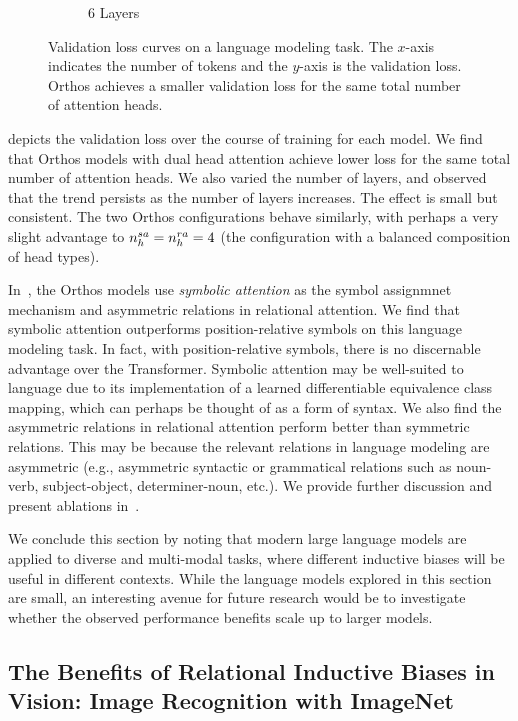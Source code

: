 \begin{figure}[ht]
\begin{subfigure}{0.33\textwidth}
        \caption{6 Layers}
    \end{subfigure}
    \caption{Validation loss curves on a language modeling task. The $x$-axis indicates the number of tokens and the $y$-axis is the validation loss. Orthos achieves a smaller validation loss for the same total number of attention heads.}\label{fig:tiny_stories_val_loss_curves}
\end{figure}

 depicts the validation loss over the course of training for each model. We find that Orthos models with dual head attention achieve lower loss for the same total number of attention heads. We also varied the number of layers, and observed that the trend persists as the number of layers increases. The effect is small but consistent. The two Orthos configurations behave similarly, with perhaps a very slight advantage to $n_h^{sa} = n_h^{ra} = 4$ (the configuration with a balanced composition of head types).

In~, the Orthos models use \textit{symbolic attention} as the symbol assignmnet mechanism and asymmetric relations in relational attention. We find that symbolic attention outperforms position-relative symbols on this language modeling task. In fact, with position-relative symbols, there is no discernable advantage over the Transformer. Symbolic attention may be well-suited to language due to its implementation of a learned differentiable equivalence class mapping, which can perhaps be thought of as a form of syntax. We also find the asymmetric relations in relational attention perform better than symmetric relations. This may be because the relevant relations in language modeling are asymmetric (e.g., asymmetric syntactic or grammatical relations such as noun-verb, subject-object, determiner-noun, etc.). We provide further discussion and present ablations in~.

We conclude this section by noting that modern large language models are applied to diverse and multi-modal tasks, where different inductive biases will be useful in different contexts. While the language models explored in this section are small, an interesting avenue for future research would be to investigate whether the observed performance benefits scale up to larger models.

\subsection{The Benefits of Relational Inductive Biases in Vision: Image Recognition with ImageNet}\label{ssec:imagenet}

